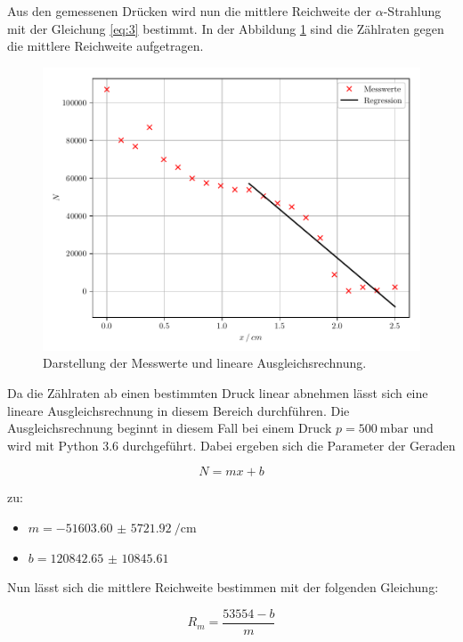 Aus den gemessenen Drücken wird nun die mittlere Reichweite der $\alpha$-Strahlung
mit der Gleichung \ref{eq:3} bestimmt. In der Abbildung \ref{abb:2} sind die Zählraten
gegen die mittlere Reichweite aufgetragen.

\begin{figure}[H]
  \centering
  \includegraphics{plot1.pdf}
  \caption{Darstellung der Messwerte und lineare Ausgleichsrechnung.}
  \label{abb:2}
\end{figure}

Da die Zählraten ab einen bestimmten Druck linear abnehmen lässt sich eine lineare
Ausgleichsrechnung in diesem Bereich durchführen. Die Ausgleichsrechnung beginnt in
diesem Fall bei einem Druck $p = \SI{500}{\milli\bar}$ und wird mit Python 3.6
durchgeführt. Dabei ergeben sich die Parameter
der Geraden

\begin{equation}
  N = mx + b
\end{equation}

zu:

\begin{itemize}
  \item $m = \SI{-51603.60(572192)}{\per\centi\meter}$
  \item $b = \num{120842.65(1084561)}$
\end{itemize}

Nun lässt sich die mittlere Reichweite bestimmen mit der folgenden Gleichung:

\begin{equation}
  R_m = \frac{53554-b}{m}
  \label{eq:5}
\end{equation}

